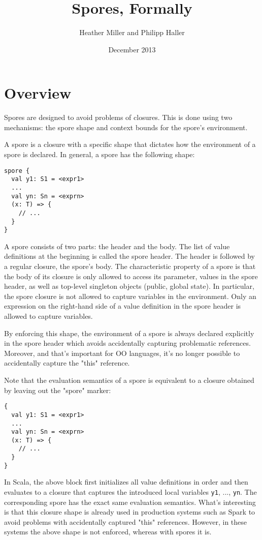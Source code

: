 \documentclass[a4paper,twoside]{article}
\title{Spores, Formally}
\author{Heather Miller and Philipp Haller}
\date{December 2013}
\begin{document}
\maketitle

\section{Overview}

Spores are designed to avoid problems of closures. This is done using two mechanisms: the spore shape and context bounds for the spore's environment.

A spore is a closure with a specific shape that dictates how the environment of a spore is declared. In general, a spore has the following shape:

\begin{verbatim}
spore {
  val y1: S1 = <expr1>
  ...
  val yn: Sn = <exprn>
  (x: T) => {
    // ...
  }
}
\end{verbatim}

A spore consists of two parts: the header and the body. The list of value definitions at the beginning is called the spore header. The header is followed by a regular closure, the spore's body. The characteristic property of a spore is that the body of its closure is only allowed to access its parameter, values in the spore header, as well as top-level singleton objects (public, global state). In particular, the spore closure is not allowed to capture variables in the environment. Only an expression on the right-hand side of a value definition in the spore header is allowed to capture variables.

By enforcing this shape, the environment of a spore is always declared explicitly in the spore header which avoids accidentally capturing problematic references. Moreover, and that's important for OO languages, it's no longer possible to accidentally capture the "this" reference.

Note that the evaluation semantics of a spore is equivalent to a closure obtained by leaving out the "spore" marker:

\begin{verbatim}
{
  val y1: S1 = <expr1>
  ...
  val yn: Sn = <exprn>
  (x: T) => {
    // ...
  }
}
\end{verbatim}

In Scala, the above block first initializes all value definitions in order and then evaluates to a closure that captures the introduced local variables \verb|y1|, ..., \verb|yn|. The corresponding spore has the exact same evaluation semantics. What's interesting is that this closure shape is already used in production systems such as Spark to avoid problems with accidentally captured "this" references. However, in these systems the above shape is not enforced, whereas with spores it is.
\end{document}
